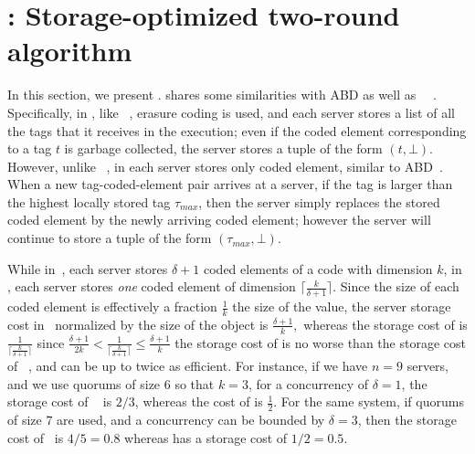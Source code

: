 \section{\treasmod: Storage-optimized two-round algorithm}\label{sec:treasmod}

In this section,  we present  \treasmod{}. 
\treasmod{}  shares some similarities with ABD \cite{ABD96} as well as ~\treas~\cite{NicolaouC0KML19}. Specifically, in \treasmod{}, like ~\treas{}, erasure coding is used, and each server stores a list of all the tags that it receives in the execution; even if the coded element corresponding to a tag $t$ is garbage collected, the server stores a tuple of the form $(t, \bot)$. However, unlike ~\treas{}, in \treasmod{} each server stores only coded element, similar to ABD~\cite{ABD96}. When a new tag-coded-element pair arrives  at a server, if the tag is larger than the highest locally stored tag $\tau_{max}$, then the server simply replaces the stored coded element by the newly arriving coded element; however the server will continue to store a tuple of the form $(\tau_{max},\bot)$.

While in~\treas{}, each server stores $\delta+1$ coded elements of a code with dimension $k$, in \treasmod{}, each server stores \emph{one} coded element of dimension ${\lceil \frac{k}{\delta+1} \rceil}$. Since the size of each coded element is effectively a fraction $\frac{1}{k}$ the size of the value, the server storage cost in~\treas{} normalized by the size of the object is $\frac{\delta+1}{k},$ whereas the storage cost of \treasmod{} is $\frac{1}{\lceil \frac{k}{\delta+1}\rceil}$  since 
$  \frac{\delta+1}{2 k} < \frac{1}{\lceil \frac{k}{\delta+1}\rceil} \leq \frac{\delta+1}{k}$
the storage cost of \treasmod{} is no worse than the storage cost of ~\treas{}, and can be up to twice as efficient. For instance, if we have $n=9$ servers, and we use quorums of size $6$ so that $k=3$, for a concurrency of $\delta=1$, the storage cost of ~\treas{} is $2/3$, whereas the cost of \treasmod{} is $\frac{1}{2}.$ For the same system, if quorums of size $7$ are used, and a concurrency can be bounded by $\delta=3$, then the storage cost of~\treas{} is $4/5=0.8$ whereas \treasmod{} has a storage cost of $1/2=0.5$. 

